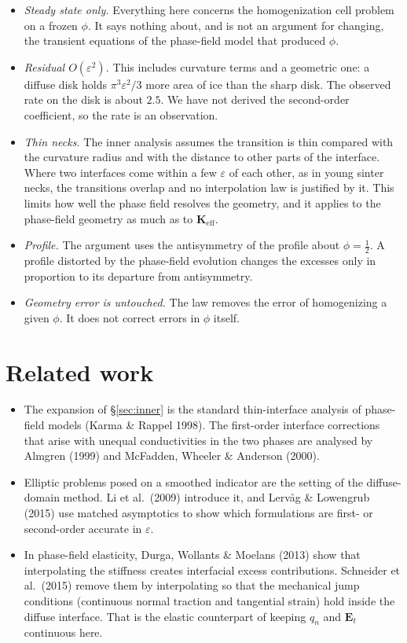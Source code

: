 \documentclass[11pt]{article}
\newcommand{\Keff}{\mathbf{K}_{\mathrm{eff}}}
\begin{document}
\begin{itemize}
\item \emph{Steady state only.} Everything here concerns the homogenization
cell problem on a frozen $\phi$. It says nothing about, and is not an
argument for changing, the transient equations of the phase-field model that
produced $\phi$.
\item \emph{Residual $O(\varepsilon^2)$.} This includes curvature terms and a
geometric one: a diffuse disk holds $\pi^3\varepsilon^2/3$ more area of ice than
the sharp disk. The observed rate on the disk is about $2.5$. We have not
derived the second-order coefficient, so the rate is an observation.
\item \emph{Thin necks.} The inner analysis assumes the transition is thin
compared with the curvature radius and with the distance to other parts of the
interface. Where two interfaces come within a few $\varepsilon$ of each other,
as in young sinter necks, the transitions overlap and no interpolation law is
justified by it. This limits how well the phase field resolves the geometry, and
it applies to the phase-field geometry as much as to $\Keff$.
\item \emph{Profile.} The argument uses the antisymmetry of the profile about
$\phi=\tfrac12$. A profile distorted by the phase-field evolution changes the
excesses only in proportion to its departure from antisymmetry.
\item \emph{Geometry error is untouched.} The law removes the error of
homogenizing a given $\phi$. It does not correct errors in $\phi$ itself.
\end{itemize}

\section{Related work}

\begin{itemize}
\item The expansion of \S\ref{sec:inner} is the standard thin-interface
analysis of phase-field models (Karma \& Rappel 1998). The first-order interface
corrections that arise with unequal conductivities in the two phases are
analysed by Almgren (1999) and McFadden, Wheeler \& Anderson (2000).
\item Elliptic problems posed on a smoothed indicator are the setting of the
diffuse-domain method. Li et al.\ (2009) introduce it, and Lervåg \& Lowengrub
(2015) use matched asymptotics to show which formulations are first- or
second-order accurate in $\varepsilon$.
\item In phase-field elasticity, Durga, Wollants \& Moelans (2013) show that
interpolating the stiffness creates interfacial excess contributions. Schneider
et al.\ (2015) remove them by interpolating so that the mechanical jump
conditions (continuous normal traction and tangential strain) hold inside the
diffuse interface. That is the elastic counterpart of keeping $q_n$ and
$\mathbf E_t$ continuous here.
\end{itemize}
\end{document}
